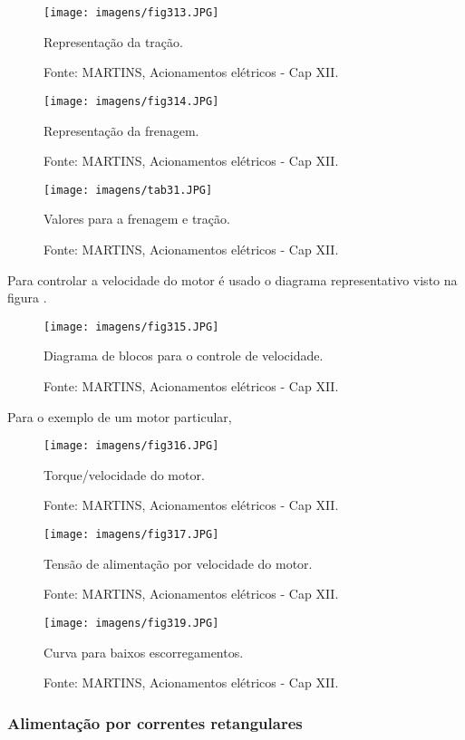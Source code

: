 \begin{figure}[ht!]
\center
\texttt{[image: imagens/fig313.JPG]}
\caption{\label{fig:fig313} Representação da tração.}
\caption*{Fonte: MARTINS, Acionamentos elétricos - Cap XII.}
\end{figure}

\begin{figure}[ht!]
\center
\texttt{[image: imagens/fig314.JPG]}
\caption{\label{fig:fig314} Representação da frenagem.}
\caption*{Fonte: MARTINS, Acionamentos elétricos - Cap XII.}
\end{figure}

\begin{figure}[ht!]
\center
\texttt{[image: imagens/tab31.JPG]}
\caption{\label{fig:tab31} Valores para a frenagem e tração.}
\caption*{Fonte: MARTINS, Acionamentos elétricos - Cap XII.}
\end{figure}

Para controlar a velocidade do motor é usado o diagrama representativo visto na figura \label{fig:fig315}.

\begin{figure}[ht!]
\center
\texttt{[image: imagens/fig315.JPG]}
\caption{\label{fig:fig315} Diagrama de blocos para o controle de velocidade.}
\caption*{Fonte: MARTINS, Acionamentos elétricos - Cap XII.}
\end{figure}

Para o exemplo de um motor particular,

\begin{figure}[ht!]
\center
\texttt{[image: imagens/fig316.JPG]}
\caption{\label{fig:fig316} Torque/velocidade do motor.}
\caption*{Fonte: MARTINS, Acionamentos elétricos - Cap XII.}
\end{figure}

\begin{figure}[ht!]
\center
\texttt{[image: imagens/fig317.JPG]}
\caption{\label{fig:fig317} Tensão de alimentação por velocidade do motor.}
\caption*{Fonte: MARTINS, Acionamentos elétricos - Cap XII.}
\end{figure}

\begin{figure}[ht!]
\center
\texttt{[image: imagens/fig319.JPG]}
\caption{\label{fig:fig319} Curva para baixos escorregamentos.}
\caption*{Fonte: MARTINS, Acionamentos elétricos - Cap XII.}
\end{figure}

\subsubsection{Alimentação por correntes retangulares}

